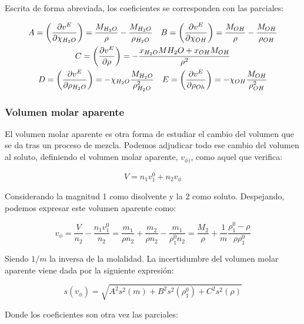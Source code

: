 \documentclass[a4paper,12pt,titlepage]{article}
\begin{document}
Escrita de forma abreviada, los coeficientes se corresponden con las parciales:

\begin{equation}
    \begin{gathered}
        A = \left( \pdv{v^{E}}{\chi_{H_2O}} \right) =  \frac{M_{H_2O}}{\rho} - \frac{M_{H_2O}}{\rho_{H_2O}} \quad B = \left( \pdv{v^{E}}{\chi_{OH}} \right) = \frac{M_{OH}}{\rho} - \frac{M_{OH}}{\rho_{OH}} \\
        C = \left(\pdv{v^E}{\rho}\right) = -\frac{x_{H_2O}M{H_2O} + x_{OH}M_{OH}}{\rho^2} \\
        D = \left(\pdv{v^E}{\rho_{H_2O}}\right) = -\chi_{H_2O}\frac{M_{H_2O}}{\rho^2_{H_2O}} \quad E = \left(\pdv{v^E}{\rho_{Oh}}\right) = -\chi_{OH}\frac{M_{OH}}{\rho^2_{OH}}
    \end{gathered}
\end{equation}

\subsubsection{Volumen molar aparente}

El volumen molar aparente es otra forma de estudiar el cambio del volumen que se da tras un proceso de mezcla. Podemos adjudicar todo ese cambio del volumen al soluto, definiendo el volumen molar aparente, $v_{\phi)}$,  como aquel que verifica:

\begin{equation}
    V = n_1v_1^0 + n_2v_{\phi}
\end{equation}

Considerando la magnitud 1 como disolvente y la 2 como soluto. Despejando, podemos expresar este volumen aparente como:

\begin{equation}
    v_{\phi} = \frac{V}{n_2} - \frac{n_1v_1^0}{n_2} = \frac{m_1}{\rho n_2} + \frac{m_2}{\rho n_2} - \frac{m_1}{\rho_1^0 n_2} = \frac{M_2}{\rho} + \frac{1}{m} \frac{\rho_1^0 - \rho}{\rho \rho_1^0}
\end{equation}

Siendo $1/m$ la inversa de la molalidad. La incertidumbre del volumen molar aparente viene dada por la siguiente expresión:

\begin{equation}
    s(v_{\phi}) = \sqrt{A^2 s^2(m) + B^2s^2(\rho_1^0) + C^2s^2(\rho)}
\end{equation}

Donde los coeficientes son otra vez las parciales:
\end{document}
